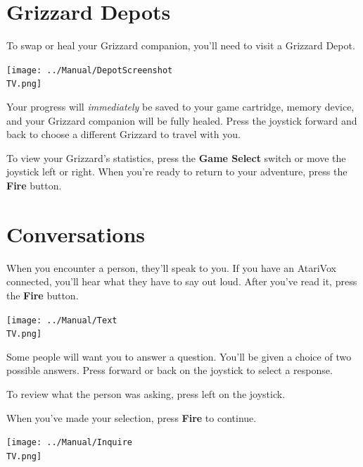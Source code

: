 \documentclass[10pt,twocolumn,openany,article]{memoir}
\newcommand\TV{NTSC} %
\begin{document}
\section{Grizzard Depots}\label{sec:GrizzardDepot}

To  \ifdefined\NOSAVE\else swap  or  \fi heal  your Grizzard  companion,
you'll need to visit a Grizzard Depot.

\begin{center}
  \texttt{[image: ../Manual/DepotScreenshot\\TV.png]}
\end{center}

\ifdefined\NOSAVE\else Your progress will \emph{immediately} be saved to
your \ifdefined\ATARIAGESAVE  game cartridge,  \else memory  device, \fi
\fi   and    your   Grizzard    companion   will   be    fully   healed.
\ifdefined\NOSAVE\else  Press the  joystick forward  and back  to choose
a different Grizzard to travel with you. \fi

To  view  your Grizzard's  statistics,  press  the \textbf{Game  Select}
switch or move  the joystick left or right. When  you're ready to return
to your adventure, press the \textbf{Fire} button.

\section{Conversations}

When  you encounter  a person,  they'll  speak to  you. If  you have  an
AtariVox  connected,  you'll  hear  what  they have  to  say  out  loud.
After you've read it, press the \textbf{Fire} button.

\begin{center}
  \texttt{[image: ../Manual/Text\\TV.png]}
\end{center}

Some people will want you to answer a question. You'll be given a choice
of two possible answers. Press forward or back on the joystick to select
a response.

To review  what  the  person  was  asking, press  left  on
the joystick.

When you've made your selection, press \textbf{Fire} to continue.

\begin{center}
  \texttt{[image: ../Manual/Inquire\\TV.png]}
\end{center}
\end{document}
